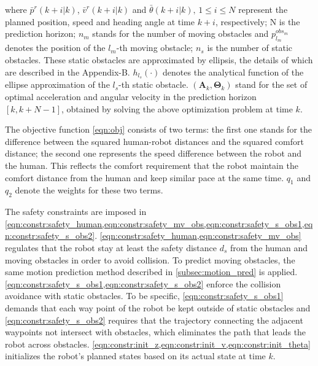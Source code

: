 \documentclass[letterpaper, 10 pt, conference]{ieeeconf}
\begin{document}
	where $\bar{p}^r(k+i|k)$, $\bar{v}^r(k+i|k)$ and $\bar{\theta}(k+i|k),\, 1\le i\le N$ represent the planned position, speed and heading angle at time $k+i$, respectively;
	N is the prediction horizon;
	$n_m$ stands for the number of moving obstacles and $p^{obs_m}_{l_m}$ denotes the position of the $l_m$-th moving obstacle;
	$n_s$ is the number of static obstacles.
	These static obstacles are approximated by ellipsis, the details of which are described in the Appendix-B.
	$h_{l_s}(\cdot)$ denotes the analytical function of the ellipse approximation of the $l_s$-th static obstacle.
	$(\mathbf{A}_k,\mathbf{\Theta}_k)$ stand for the set of optimal acceleration and angular velocity in the prediction  horizon $[k,k+N-1]$, obtained by solving the above optimization problem at time $k$.
	
	The objective function \cref{eqn:obj} consists of two terms: the first one stands for the difference between the squared human-robot distances and the squared comfort distance; the second one represents the speed difference between the robot and the human.
	This reflects the comfort requirement that the robot maintain the comfort distance from the human and keep similar pace at the same time.
	$q_1$ and $q_2$ denote the weights for these two terms.
	
	The safety constraints are imposed in \cref{eqn:constr:safety_human,eqn:constr:safety_mv_obs,eqn:constr:safety_s_obs1,eqn:constr:safety_s_obs2}.
	\cref{eqn:constr:safety_human,eqn:constr:safety_mv_obs} regulates that the robot stay at least the safety distance $d_s$ from the human and moving obstacles in order to avoid collision.
	To predict moving obstacles, the same motion prediction method described in \cref{subsec:motion_pred} is applied.
	\cref{eqn:constr:safety_s_obs1,eqn:constr:safety_s_obs2} enforce the collision avoidance with static obstacles.
	To be specific, \cref{eqn:constr:safety_s_obs1} demands that each way point of the robot be kept outside of static obstacles and	\cref{eqn:constr:safety_s_obs2} requires that the trajectory connecting the adjacent waypoints not intersect with obstacles, which eliminates the path that leads the robot across obstacles.
	\cref{eqn:constr:init_z,eqn:constr:init_v,eqn:constr:init_theta} initializes the robot's planned states based on its actual state at time $k$.
	
\end{document}
